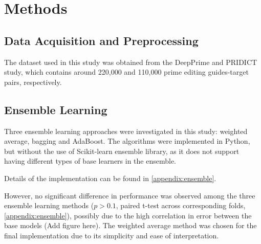 \section{Methods}

\subsection*{Data Acquisition and Preprocessing}

The dataset used in this study was obtained from the DeepPrime and PRIDICT study\cite{mathisPredictingPrimeEditing2023,mathisMachineLearningPrediction2024,yuPredictionEfficienciesDiverse2023}, which contains around 220,000 and 110,000 prime editing guides-target pairs, respectively. 

\subsection*{Ensemble Learning}

Three ensemble learning approaches were investigated in this study: weighted average, bagging and AdaBoost. The algorithms were implemented in Python, but without the use of Scikit-learn ensemble library, as it does not support having different types of base learners in the ensemble.  

Details of the implementation can be found in \autoref{appendix:ensemble}.

However, no significant difference in performance was observed among the three ensemble learning methods ($p>0.1$, paired t-test across corresponding folds, \autoref{appendix:ensemble}), possibly due to the high correlation in error between the base models (Add figure here). The weighted average method was chosen for the final implementation due to its simplicity and ease of interpretation.